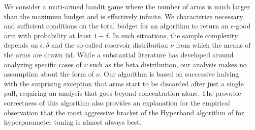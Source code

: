We consider a muti-armed bandit game where the number of arms is much larger than the maximum budget and is effectively infinite.
We characterize necessary and sufficient conditions on the total budget for an algorithm to return an $\epsilon$-good arm with probability at least $1-\delta$.
In such situations, the sample complexity depends on $\epsilon, \delta$ and the so-called reservoir distribution $\nu$ from which the means of the arms are drawn iid. 
While a substantial literature has developed around analyzing specific cases of $\nu$ such as the beta distribution, our analysis makes no assumption about the form of $\nu$.
Our algorithm is based on successive halving with the surprising exception that arms start to be discarded after just a single pull, requiring an analysis that goes beyond concentration alone. 
The provable correctness of this algorithm also provides an explanation for the empirical observation that the most aggressive bracket of the Hyperband algorithm of \cite{li2017hyperband} for hyperparameter tuning is almost always best.    





\clearpage



%

